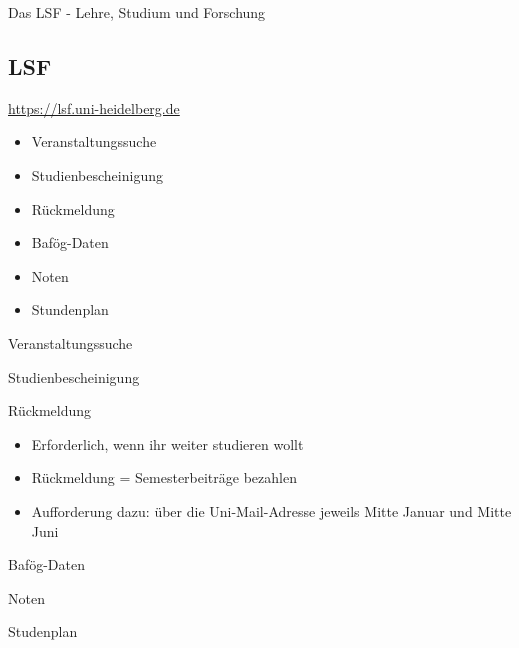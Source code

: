 \begin{frame}{Das LSF - Lehre, Studium und Forschung}
  \subsection{LSF}

  \url{https://lsf.uni-heidelberg.de}

  \begin{center}
  \end{center}

  \begin{itemize}
    \item{Veranstaltungssuche}
    \item{Studienbescheinigung}
    \item{Rückmeldung}
    \item{Bafög-Daten}
    \item{Noten}
    \item{Stundenplan}
  \end{itemize}
\end{frame}

\begin{frame}{Veranstaltungssuche}
\end{frame}

\begin{frame}{Studienbescheinigung}
\end{frame}

\begin{frame}{Rückmeldung}
  \begin{itemize}
    \item{Erforderlich, wenn ihr weiter studieren wollt}
    \item{Rückmeldung = Semesterbeiträge bezahlen}
    \item{Aufforderung dazu: über die Uni-Mail-Adresse jeweils Mitte Januar und Mitte Juni}
\end{itemize}
\end{frame}

\begin{frame}{Bafög-Daten}
\end{frame}

\begin{frame}{Noten}
\end{frame}

\begin{frame}{Studenplan}
\end{frame}


